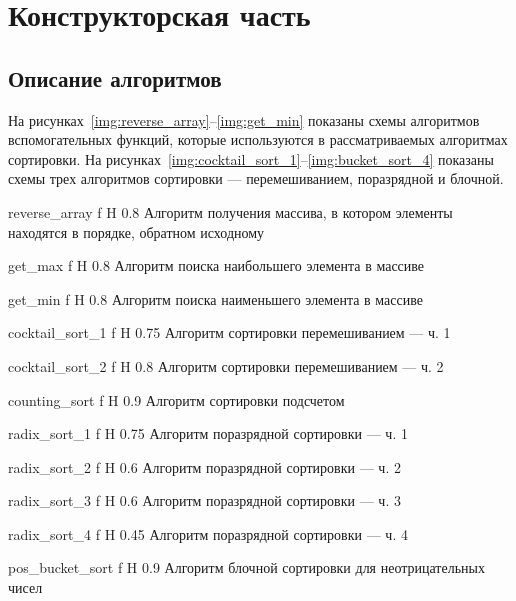 \chapter{Конструкторская часть}
\section{Описание алгоритмов}

На рисунках~\ref{img:reverse_array}--\ref{img:get_min} показаны схемы алгоритмов вспомогательных функций, которые используются в рассматриваемых алгоритмах сортировки. 
На рисунках~\ref{img:cocktail_sort_1}--\ref{img:bucket_sort_4} показаны схемы трех алгоритмов сортировки --- перемешиванием, поразрядной и блочной.

    {reverse_array}
    {f}
    {H}
    {0.8\textwidth}
    {Алгоритм получения массива, в котором элементы находятся в порядке, обратном исходному}

    {get_max}
    {f}
    {H}
    {0.8\textwidth}
    {Алгоритм поиска наибольшего элемента в массиве}
    
    {get_min}
    {f}
    {H}
    {0.8\textwidth}
    {Алгоритм поиска наименьшего элемента в массиве}
    
    {cocktail_sort_1}
    {f}
    {H}
    {0.75\textwidth}
    {Алгоритм сортировки перемешиванием --- ч. 1}
    
    {cocktail_sort_2}
    {f}
    {H}
    {0.8\textwidth}
    {Алгоритм сортировки перемешиванием --- ч. 2}
    
    {counting_sort}
    {f}
    {H}
    {0.9\textwidth}
    {Алгоритм сортировки подсчетом}
    
    {radix_sort_1}
    {f}
    {H}
    {0.75\textwidth}
    {Алгоритм поразрядной сортировки --- ч. 1}
    
    {radix_sort_2}
    {f}
    {H}
    {0.6\textwidth}
    {Алгоритм поразрядной сортировки --- ч. 2}
    
    {radix_sort_3}
    {f}
    {H}
    {0.6\textwidth}
    {Алгоритм поразрядной сортировки --- ч. 3}
    
    {radix_sort_4}
    {f}
    {H}
    {0.45\textwidth}
    {Алгоритм поразрядной сортировки --- ч. 4}
    
    {pos_bucket_sort}
    {f}
    {H}
    {0.9\textwidth}
    {Алгоритм блочной сортировки для неотрицательных чисел}
    
